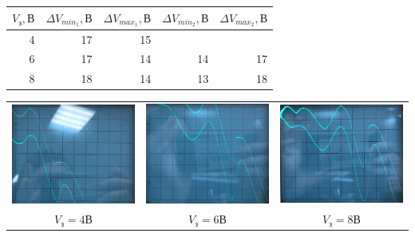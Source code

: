 \documentclass[a4paper,12pt]{article} %
\begin{document}
\begin{table}[h!]
\begin{tabular}{|r|r|r|l|l|}
\hline
\multicolumn{1}{|l|}{$V_{\text{з}}, \text{В}$} & \multicolumn{1}{l|}{$\Delta V_{min_1}, \text{В}$} & \multicolumn{1}{l|}{$\Delta V_{max_1}, \text{В}$} & $\Delta V_{min_2}, \text{В}$       & $\Delta V_{max_2}, \text{В}$       \\ \hline
4                                              & 17                                     & 15                                     &                         &                         \\ \hline
6                                              & 17                                     & 14                                     & \multicolumn{1}{r|}{14} & \multicolumn{1}{r|}{17} \\ \hline
8                                              & 18                                     & 14                                     & \multicolumn{1}{r|}{13} & \multicolumn{1}{r|}{18} \\ \hline
\end{tabular}
\end{table}
 
\begin{table}[h!]
\begin{tabular}{lll}
\includegraphics[width=0.3\linewidth]{1.jpg} & \includegraphics[width=0.3\linewidth]{2.jpg} & \includegraphics[width=0.3\linewidth]{3.jpg} \\
\multicolumn{1}{c}{$V_{\text{з}} = 4\text{В}$} & \multicolumn{1}{c}{$V_{\text{з}} = 6\text{В}$} & \multicolumn{1}{c}{$V_{\text{з}} = 8\text{В}$}
\end{tabular}
\end{table}
\end{document}
